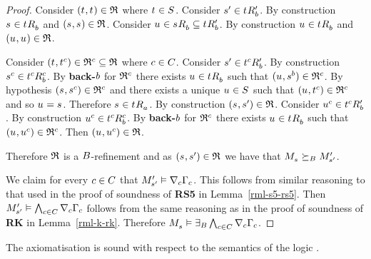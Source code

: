 \begin{proof}
Consider $(\kStateT, \kStateT) \in \refinement$ where $\kStateT \in \kStates$.
Consider $\kStateSP \in \kSuccessorsPB{\kStateT}$.
By construction $\kStateS \in \kSuccessorsB{\kStateT}$ and $(\kStateS, \kStateS) \in \refinement$.
Consider $\kStateU \in \kSuccessorsB{\kStateS} \subseteq \kSuccessorsPB{\kStateT}$.
By construction $\kStateU \in \kSuccessorsB{\kStateT}$ and $(\kStateU, \kStateU) \in \refinement$.

Consider $(\kStateT, \kStateT[\agentC]) \in \refinement^\agentC \subseteq \refinement$ where $\agentC \in \agentsC$.
Consider $\kStateSP \in \kSuccessorsPB{\kStateT[\agentC]}$.
By construction $\kStateS[\agentC] \in \kSuccessorsB[\agentC]{\kStateT[\agentC]}$.
By {\bf back-$\agentB$} for $\refinement^\agentC$ there exists $\kStateU \in \kSuccessorsB{\kStateT}$ such that $(\kStateU, \kStateS[\agentB]) \in \refinement^\agentC$.
By hypothesis $(\kStateS, \kStateS[\agentC]) \in \refinement^\agentC$ and there exists a unique $\kStateU \in \kStates$ such that $(\kStateU, \kStateT[\agentC]) \in \refinement^\agentC$ and so $\kStateU = \kStateS$.
Therefore $\kStateS \in \kSuccessorsA{\kStateT}$.
By construction $(\kStateS, \kStateSP) \in \refinement$.
Consider $\kStateU[\agentC] \in \kSuccessorsPB{\kStateT[\agentC]}$.
By construction $\kStateU[\agentC] \in \kSuccessorsB[\agentC]{\kStateT[\agentC]}$.
By {\bf back-$\agentB$} for $\refinement^\agentC$ there exists $\kStateU \in \kSuccessorsB{\kStateT}$ such that $(\kStateU, \kStateU[\agentC]) \in \refinement^\agentC$.
Then $(\kStateU, \kStateU[\agentC]) \in \refinement$.

Therefore $\refinement$ is a $\agentsB$-refinement and as $(\kStateS, \kStateSP) \in \refinement$ we have that $\kPModel{\kStateS} \simulatesBs \kPModelP{\kStateSP}$.

We claim for every $\agentC \in \agentsC$ that $\kPModelP{\kStateSP} \entails \coversC \Gamma_\agentC$.
This follows from similar reasoning to that used in the proof of soundness of {\bf RS5} in Lemma~\ref{rml-s5-rs5}.
Then $\kPModelP{\kStateSP} \entails \bigwedge_{\agentC \in \agentsC} \coversC \Gamma_\agentC$ follows from the same reasoning as in the proof of soundness of {\bf RK} in Lemma~\ref{rml-k-rk}.
Therefore $\kPModel{\kStateS} \entails \somerefsBs \bigwedge_{\agentC \in \agentsC} \coversC \Gamma_\agentC$.
\end{proof}

\begin{lemma}
The axiomatisation \axiomRmlS{} is sound with respect to the semantics of the logic \logicRmlS{}.
\end{lemma}

